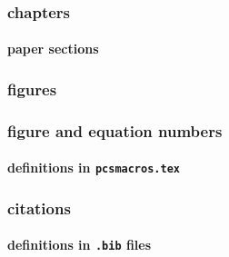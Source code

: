 \begin{frame} \frametitle{chapters}
  \framesubtitle{paper sections}
  \normalsize
\end{frame}
\cwpnote{}

\begin{frame} \frametitle{figures}
  \framesubtitle{}
  \normalsize
\end{frame}
\cwpnote{}

\begin{frame} \frametitle{figure and equation numbers}
  \framesubtitle{definitions in \texttt{pcsmacros.tex}}
  \normalsize
\end{frame}
\cwpnote{}

\begin{frame} \frametitle{citations}
  \framesubtitle{definitions in \texttt{.bib} files}
  \normalsize
\end{frame}
\cwpnote{}

\begin{frame}


  \vfill


  \vfill

  \begin{center}
  \end{center}

\end{frame}
\cwpnote{}
